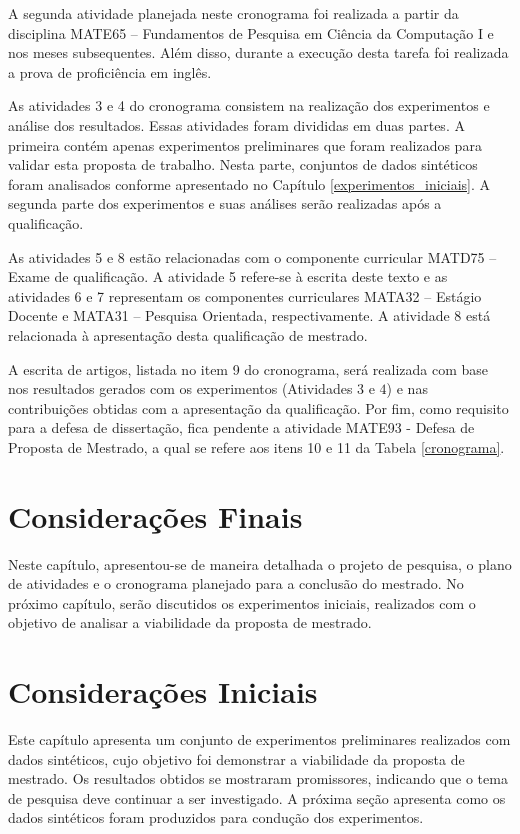 \documentclass[msc, classic, a4paper]{ufbathesis}
\begin{document}
A segunda atividade planejada neste cronograma foi realizada a partir da disciplina MATE65 -- Fundamentos de Pesquisa em Ciência da Computação I
e nos meses subsequentes. Além disso, durante a execução desta tarefa foi realizada a prova de proficiência em inglês.

As atividades 3 e 4 do cronograma consistem na realização dos experimentos e análise dos resultados.
Essas atividades foram divididas em duas partes.
A primeira contém apenas experimentos preliminares que foram realizados para validar esta proposta de trabalho.
Nesta parte, conjuntos de dados sintéticos foram analisados conforme apresentado no Capítulo \ref{experimentos_iniciais}.
A segunda parte dos experimentos e suas análises serão realizadas após a qualificação.

As atividades 5 e 8 estão relacionadas com o componente curricular MATD75 -- Exame de qualificação. A atividade 5 refere-se à escrita deste texto e as atividades 6 e 7 representam os componentes curriculares MATA32 -- Estágio Docente e MATA31 -- Pesquisa Orientada, respectivamente. A atividade 8 está relacionada à apresentação desta qualificação de mestrado.

A escrita de artigos, listada no item 9 do cronograma, será realizada com base nos resultados gerados com os experimentos (Atividades $3$ e $4$) e nas contribuições obtidas com a apresentação da qualificação. Por fim, como requisito para a defesa de dissertação, fica pendente a atividade MATE93 - Defesa de Proposta de Mestrado, a qual se refere aos itens 10 e 11 da Tabela \ref{cronograma}.

\section{Considerações Finais}

Neste capítulo, apresentou-se de maneira detalhada o projeto de pesquisa, o plano de atividades e o cronograma planejado para a conclusão do mestrado.
No próximo capítulo, serão discutidos os experimentos iniciais, realizados com o objetivo de analisar a viabilidade da proposta de mestrado.

 \label{experimentos_iniciais}
\section{Considerações Iniciais}

Este capítulo apresenta um conjunto de experimentos preliminares realizados com dados sintéticos, cujo objetivo foi demonstrar a viabilidade da proposta de mestrado.
%
Os resultados obtidos se mostraram promissores, indicando que o tema de pesquisa deve continuar a ser investigado.
%
A próxima seção apresenta como os dados sintéticos foram produzidos para condução dos experimentos.
\end{document}
